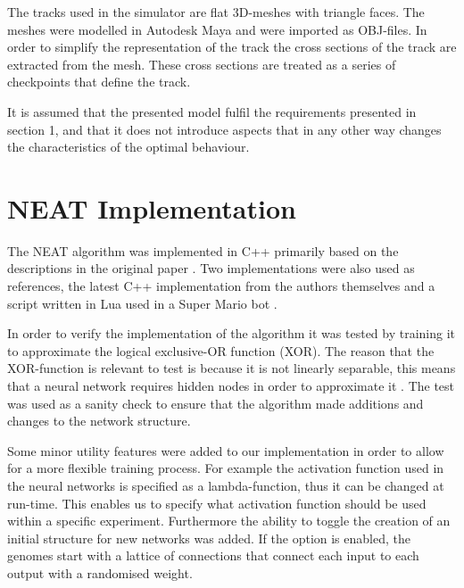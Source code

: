 The tracks used in the simulator are flat 3D-meshes with triangle faces. The meshes were modelled in Autodesk Maya and were imported as OBJ-files. In order to simplify the representation of the track the cross sections of the track are extracted from the mesh. These cross sections are treated as a series of checkpoints that define the track.  

It is assumed that the presented model fulfil the requirements presented in section 1, and that it does not introduce aspects that in any other way changes the characteristics of the optimal behaviour.


\section{NEAT Implementation}

The NEAT algorithm was implemented in C++ primarily based on the descriptions in the original paper \cite{stanley:neat}. Two implementations were also used as references, the latest C++ implementation from the authors themselves \cite{neat_source} and a script written in Lua used in a Super Mario bot \cite{mario_source}. 

In order to verify the implementation of the algorithm it was tested by training it to approximate the logical exclusive-OR function (XOR). The reason that the XOR-function is relevant to test is because it is not linearly separable, this means that a neural network requires  hidden nodes  in order to approximate it \cite{haykin:xor, stanley:neat}. The test was used as a sanity check to ensure that the algorithm made additions and changes to the network structure. 

Some minor utility features were added to our implementation in order to allow for a more flexible training process. For example the activation function used in the neural networks is specified as a lambda-function, thus it can be changed at run-time. This enables us to specify what activation function should be used within a specific experiment. Furthermore the ability to toggle the creation of an initial structure for new networks was added. If the option is enabled, the genomes start with a lattice of connections that connect each input to each output with a randomised weight. 


